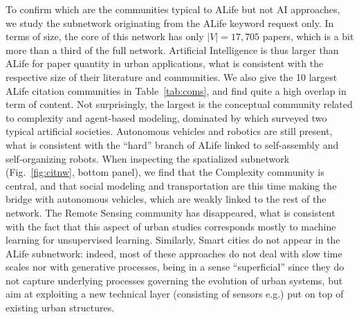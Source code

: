\documentclass[letterpaper]{article}
\begin{document}
To confirm which are the communities typical to ALife but not AI approaches, we study the subnetwork originating from the ALife keyword request only. In terms of size, the core of this network has only $\left|V\right|=17,705$ papers, which is a bit more than a third of the full network. Artificial Intelligence is thus larger than ALife for paper quantity in urban applications, what is consistent with the respective size of their literature and communities. We also give the 10 largest ALife citation communities in Table~\ref{tab:coms}, and find quite a high overlap in term of content. Not surprisingly, the largest is the conceptual community related to complexity and agent-based modeling, dominated by \cite{casti1997would} which surveyed two typical artificial societies. Autonomous vehicles and robotics are still present, what is consistent with the ``hard'' branch of ALife linked to self-assembly and self-organizing robots. When inspecting the spatialized subnetwork (Fig.~\ref{fig:citnw}, bottom panel), we find that the Complexity community is central, and that social modeling and transportation are this time making the bridge with autonomous vehicles, which are weakly linked to the rest of the network. The Remote Sensing community has disappeared, what is consistent with the fact that this aspect of urban studies corresponds mostly to machine learning for unsupervised learning. Similarly, Smart cities do not appear in the ALife subnetwork: indeed, most of these approaches do not deal with slow time scales nor with generative processes, being in a sense ``superficial'' since they do not capture underlying processes governing the evolution of urban systems, but aim at exploiting a new technical layer (consisting of sensors e.g.) put on top of existing urban structures.







\end{document}
